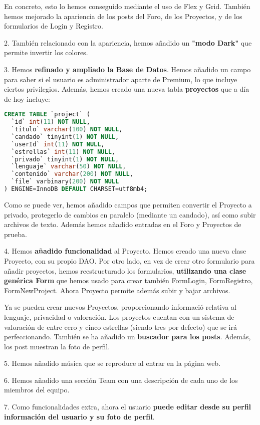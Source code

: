 \documentclass[12pt]{report}
\begin{document}
En concreto, esto lo hemos conseguido mediante el uso de Flex y Grid. También hemos mejorado la apariencia de los posts del Foro, de los Proyectos, y de los formularios de Login y Registro.

2. También relacionado con la apariencia, hemos añadido un \textbf{"modo Dark"} que permite invertir los colores.

3. Hemos \textbf{refinado y ampliado la Base de Datos}. Hemos añadido un campo para saber si el usuario es administrador aparte de Premium, lo que incluye ciertos privilegios. Además, hemos creado una nueva tabla \textbf{proyectos} que a día de hoy incluye:
\newline
\begin{lstlisting}[language=SQL]
CREATE TABLE `project` (
  `id` int(11) NOT NULL,
  `titulo` varchar(100) NOT NULL,
  `candado` tinyint(1) NOT NULL,
  `userId` int(11) NOT NULL,
  `estrellas` int(11) NOT NULL,
  `privado` tinyint(1) NOT NULL,
  `lenguaje` varchar(50) NOT NULL,
  `contenido` varchar(200) NOT NULL,
  `file` varbinary(200) NOT NULL
) ENGINE=InnoDB DEFAULT CHARSET=utf8mb4;
\end{lstlisting}
Como se puede ver, hemos añadido campos que permiten convertir el Proyecto a privado, protegerlo de cambios en paralelo (mediante un candado), así como subir archivos de texto. Además hemos añadido entradas en el Foro y Proyectos de prueba.

4. Hemos \textbf{añadido funcionalidad} al Proyecto. Hemos creado una nueva clase Proyecto, con su propio DAO. Por otro lado, en vez de crear otro formulario para añadir proyectos, hemos reestructurado los formularios, \textbf{utilizando una clase genérica Form} que hemos usado para crear también FormLogin, FormRegistro, FormNewProject. Ahora Proyecto permite además subir y bajar archivos.

Ya se pueden crear nuevos Proyectos, proporcionando informació relativa al lenguaje, privacidad o valoración. Los proyectos cuentan con un sistema de valoración de entre cero y cinco estrellas (siendo tres por defecto) que se irá perfeccionando. También se ha añadido un \textbf{buscador para los posts}. Además, los post muestran la foto de perfil.

5. Hemos añadido música que se reproduce al entrar en la página web.

6. Hemos añadido una sección Team con una descripción de cada uno de los miembros del equipo.

7. Como funcionalidades extra, ahora el usuario \textbf{puede editar desde su perfil información del usuario y su foto de perfil}.
\end{document}
